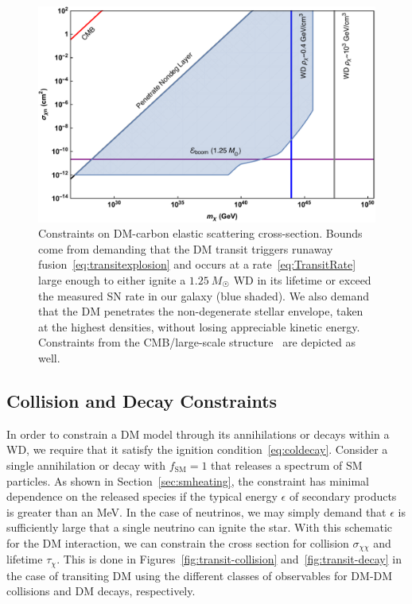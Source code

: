\begin{figure}
\includegraphics[scale=.45]{transitobservation.pdf}
\caption{Constraints on DM-carbon elastic scattering cross-section.
Bounds come from demanding that the DM transit triggers runaway fusion~\eqref{eq:transitexplosion} and occurs at a rate~\eqref{eq:TransitRate} large enough to either ignite a $1.25~M_{\astrosun}$ WD in its lifetime or exceed the measured SN rate in our galaxy (blue shaded).
We also demand that the DM penetrates the non-degenerate stellar envelope, taken at the highest densities, without losing appreciable kinetic energy.
Constraints from the CMB/large-scale structure~\cite{Dvorkin:2013cea} are depicted as well.
}
\label{fig:transit-elastic}
\end{figure}

\subsection{Collision and Decay Constraints}
\label{sec:CollisionConstraints}

In order to constrain a DM model through its annihilations or decays within a WD, we require that it satisfy the ignition condition~\eqref{eq:coldecay}.
Consider a single annihilation or decay with $f_\text{SM} = 1$ that releases a spectrum of SM particles.
As shown in Section~\ref{sec:smheating}, the constraint has minimal dependence on the released species if the typical energy $\epsilon$ of secondary products is greater than an MeV.
In the case of neutrinos, we may simply demand that $\epsilon$ is sufficiently large that a single neutrino can ignite the star.
With this schematic for the DM interaction, we can constrain the cross section for collision $\sigma_{\chi \chi}$ and lifetime $\tau_\chi$.
This is done in Figures~\ref{fig:transit-collision} and~\ref{fig:transit-decay} in the case of transiting DM using the different classes of observables for DM-DM collisions and DM decays, respectively.

